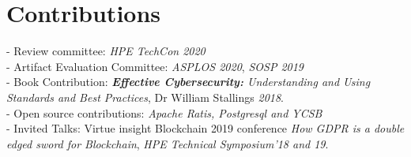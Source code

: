 \documentclass[a4paper,10pt]{article}
\begin{document}
\section{Contributions}
- Review committee: \emph{HPE TechCon 2020}\\
- Artifact Evaluation Committee: \emph{ASPLOS 2020}, \emph{SOSP 2019}\\
- Book Contribution: \emph{\textbf{Effective Cybersecurity:} Understanding and Using Standards and Best Practices}, Dr William Stallings \emph{2018}.\\
- Open source contributions: \emph{Apache Ratis, Postgresql and YCSB} \\
- Invited Talks: Virtue insight Blockchain 2019 conference \emph{How GDPR is a double edged sword for Blockchain}, \emph{HPE Technical Symposium’18 and 19}.


\end{document}
